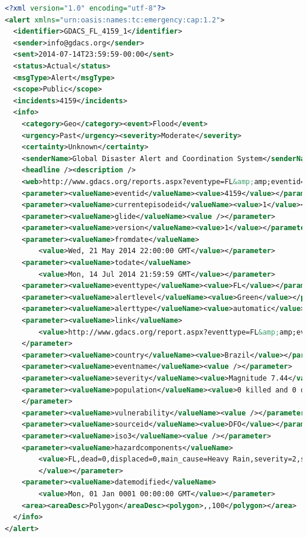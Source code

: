 \documentclass[runningheads,a4paper]{llncs}
\begin{document}
\begin{lstlisting}[caption={\emph{Common Alerting Protocol} feed
  via the \emph{Global Disaster Alert and Coordination System}
  (\url{http://www.gdacs.org/xml/gdacs_cap.xml}, 2014-07-16)},
  label=listing:cap, language=xml,morekeywords={xmlns,encoding,alert,
  identifier,sender,sent,status,msgType,scope,incidents,info,
  category,event,urgency,severity,certainty, senderName,headline,
  description,web,parameter,value,valueName,area,areaDesc,polygon},
  float=b!, stringstyle=\color{gray}, ]
<?xml version="1.0" encoding="utf-8"?>
<alert xmlns="urn:oasis:names:tc:emergency:cap:1.2">
  <identifier>GDACS_FL_4159_1</identifier>
  <sender>info@gdacs.org</sender>
  <sent>2014-07-14T23:59:59-00:00</sent>
  <status>Actual</status>
  <msgType>Alert</msgType>
  <scope>Public</scope>
  <incidents>4159</incidents>
  <info>
    <category>Geo</category><event>Flood</event>
    <urgency>Past</urgency><severity>Moderate</severity>
    <certainty>Unknown</certainty>
    <senderName>Global Disaster Alert and Coordination System</senderName>
    <headline /><description />
    <web>http://www.gdacs.org/reports.aspx?eventype=FL&amp;amp;eventid=4159</web>
    <parameter><valueName>eventid</valueName><value>4159</value></parameter>
    <parameter><valueName>currentepisodeid</valueName><value>1</value></parameter>
    <parameter><valueName>glide</valueName><value /></parameter>
    <parameter><valueName>version</valueName><value>1</value></parameter>
    <parameter><valueName>fromdate</valueName>
        <value>Wed, 21 May 2014 22:00:00 GMT</value></parameter>
    <parameter><valueName>todate</valueName>
        <value>Mon, 14 Jul 2014 21:59:59 GMT</value></parameter>
    <parameter><valueName>eventtype</valueName><value>FL</value></parameter>
    <parameter><valueName>alertlevel</valueName><value>Green</value></parameter>
    <parameter><valueName>alerttype</valueName><value>automatic</value></parameter>
    <parameter><valueName>link</valueName>
        <value>http://www.gdacs.org/report.aspx?eventtype=FL&amp;amp;eventid=4159</value>
    </parameter>
    <parameter><valueName>country</valueName><value>Brazil</value></parameter>
    <parameter><valueName>eventname</valueName><value /></parameter>
    <parameter><valueName>severity</valueName><value>Magnitude 7.44</value></parameter>
    <parameter><valueName>population</valueName><value>0 killed and 0 displaced</value>
    </parameter>
    <parameter><valueName>vulnerability</valueName><value /></parameter>
    <parameter><valueName>sourceid</valueName><value>DFO</value></parameter>
    <parameter><valueName>iso3</valueName><value /></parameter>
    <parameter><valueName>hazardcomponents</valueName>
        <value>FL,dead=0,displaced=0,main_cause=Heavy Rain,severity=2,sqkm=256564.57
        </value></parameter>
    <parameter><valueName>datemodified</valueName>
        <value>Mon, 01 Jan 0001 00:00:00 GMT</value></parameter>
    <area><areaDesc>Polygon</areaDesc><polygon>,,100</polygon></area>
  </info>
</alert>
\end{lstlisting}
\end{document}
